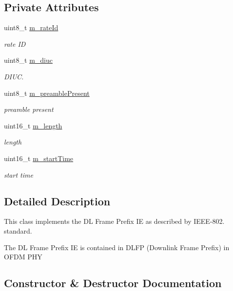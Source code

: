 \subsection*{Private Attributes}
\begin{DoxyCompactItemize}
\item 
uint8\+\_\+t \hyperlink{classns3_1_1DlFramePrefixIe_a7ee2b805b0bb5ff17836c35b137319aa}{m\+\_\+rate\+Id}
\begin{DoxyCompactList}\small\item\em rate ID \end{DoxyCompactList}\item 
uint8\+\_\+t \hyperlink{classns3_1_1DlFramePrefixIe_a255a751e972f83e65f9f6aa4cb93094d}{m\+\_\+diuc}
\begin{DoxyCompactList}\small\item\em D\+I\+UC. \end{DoxyCompactList}\item 
uint8\+\_\+t \hyperlink{classns3_1_1DlFramePrefixIe_a29e2165424da96b23e791e031ebc99fa}{m\+\_\+preamble\+Present}
\begin{DoxyCompactList}\small\item\em preamble present \end{DoxyCompactList}\item 
uint16\+\_\+t \hyperlink{classns3_1_1DlFramePrefixIe_ad951c91e96c6d2ae21d3f668751e4308}{m\+\_\+length}
\begin{DoxyCompactList}\small\item\em length \end{DoxyCompactList}\item 
uint16\+\_\+t \hyperlink{classns3_1_1DlFramePrefixIe_a3ce62c0aa1b6efe951e43250d40c985a}{m\+\_\+start\+Time}
\begin{DoxyCompactList}\small\item\em start time \end{DoxyCompactList}\end{DoxyCompactItemize}


\subsection{Detailed Description}
This class implements the DL Frame Prefix IE as described by I\+E\+E\+E-\/802. standard. 

The DL Frame Prefix IE is contained in D\+L\+FP (Downlink Frame Prefix) in O\+F\+DM P\+HY 

\subsection{Constructor \& Destructor Documentation}
